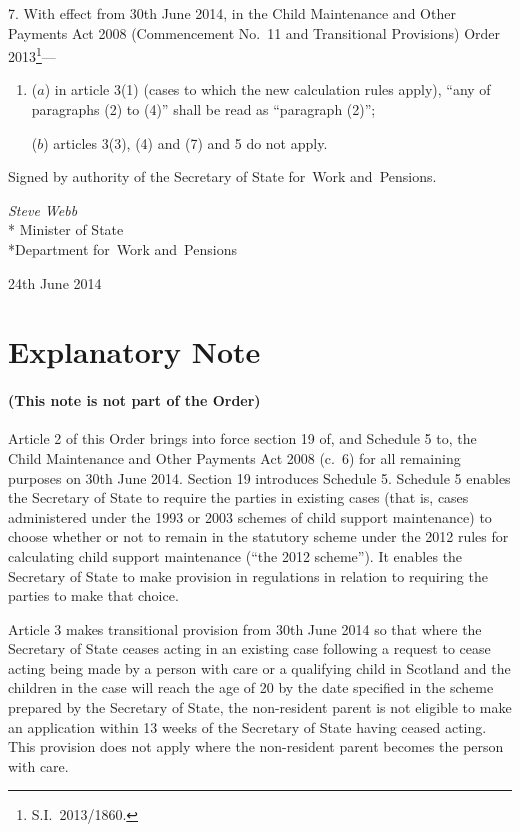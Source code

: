 \documentclass[12pt,a4paper]{article}
\begin{document}
7.  With effect from 30th June 2014, in the Child Maintenance and Other Payments Act 2008 (Commencement No.~11 and Transitional Provisions) Order 2013\footnote{S.I.~2013/1860.}—
\begin{enumerate}\item[]
($a$) in article 3(1) (cases to which the new calculation rules apply), “any of paragraphs (2) to (4)” shall be read as “paragraph (2)”;

($b$) articles 3(3), (4) and (7) and 5 do not apply. 
\end{enumerate}

\bigskip

\pagebreak[3]

Signed 
by authority of the 
Secretary of State for~Work and~Pensions.

{\raggedleft
\emph{Steve Webb}\\*
Minister
of State\\*Department 
for~Work and~Pensions

}

24th June 2014

\small

\part{Explanatory Note}

\renewcommand\parthead{— Explanatory Note}

\subsection*{(This note is not part of the Order)}

Article 2 of this Order brings into force section 19 of, and Schedule 5 to, the Child Maintenance and Other Payments Act 2008 (c.~6) for all remaining purposes on 30th June 2014. Section 19 introduces Schedule 5. Schedule 5 enables the Secretary of State to require the parties in existing cases (that is, cases administered under the 1993 or 2003 schemes of child support maintenance) to choose whether or not to remain in the statutory scheme under the 2012 rules for calculating child support maintenance (“the 2012 scheme”). It enables the Secretary of State to make provision in regulations in relation to requiring the parties to make that choice.

Article 3 makes transitional provision from 30th June 2014 so that where the Secretary of State ceases acting in an existing case following a request to cease acting being made by a person with care or a qualifying child in Scotland and the children in the case will reach the age of 20 by the date specified in the scheme prepared by the Secretary of State, the non-resident parent is not eligible to make an application within 13 weeks of the Secretary of State having ceased acting. This provision does not apply where the non-resident parent becomes the person with care.
\end{document}
